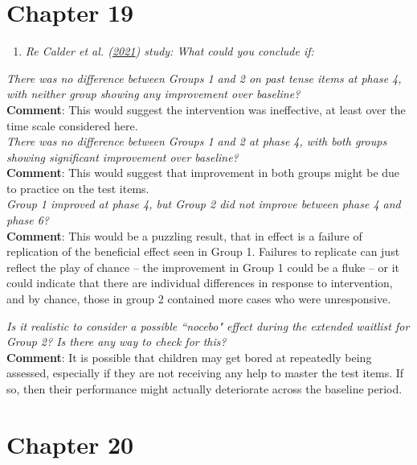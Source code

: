 \documentclass{krantz}
\providecommand{\tightlist}{%
\setlength{\itemsep}{0pt}\setlength{\parskip}{0pt}}
\begin{document}
\hypertarget{chapter-19}{%
\section{Chapter 19}\label{chapter-19}}

\begin{enumerate}
\def\labelenumi{\arabic{enumi}.}
\tightlist
\item
  \emph{Re Calder et al. (\protect\hyperlink{ref-calder2021}{2021}) study: What could you conclude if:}
\end{enumerate}

\emph{There was no difference between Groups 1 and 2 on past tense items at phase 4, with neither group showing any improvement over baseline?}\\
\textbf{Comment}: This would suggest the intervention was ineffective, at least over the time scale considered here.\\
\emph{There was no difference between Groups 1 and 2 at phase 4, with both groups showing significant improvement over baseline?}\\
\textbf{Comment}: This would suggest that improvement in both groups might be due to practice on the test items.\\
\emph{Group 1 improved at phase 4, but Group 2 did not improve between phase 4 and phase 6?}\\
\textbf{Comment}: This would be a puzzling result, that in effect is a failure of replication of the beneficial effect seen in Group 1. Failures to replicate can just reflect the play of chance -- the improvement in Group 1 could be a fluke -- or it could indicate that there are individual differences in response to intervention, and by chance, those in group 2 contained more cases who were unresponsive.

\emph{Is it realistic to consider a possible ``nocebo" effect during the extended waitlist for Group 2? Is there any way to check for this?}\\
\textbf{Comment}: It is possible that children may get bored at repeatedly being assessed, especially if they are not receiving any help to master the test items. If so, then their performance might actually deteriorate across the baseline period.

\hypertarget{chapter-20}{%
\section{Chapter 20}\label{chapter-20}}
\end{document}
